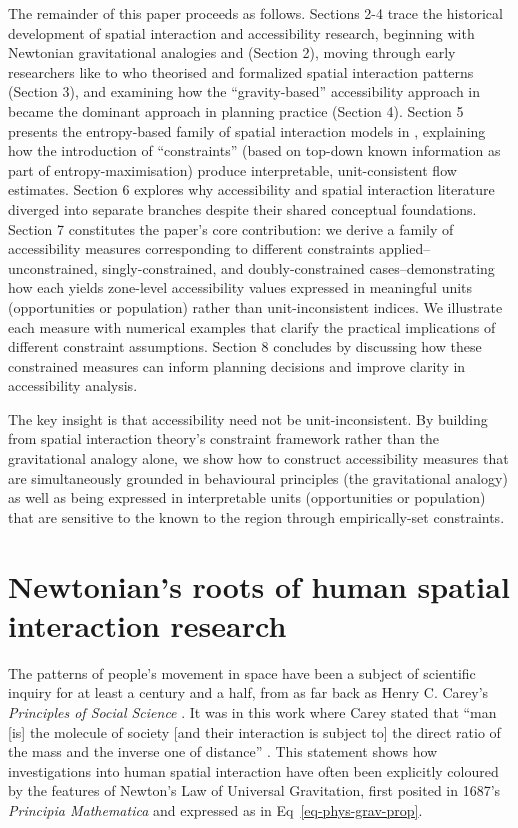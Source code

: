\documentclass[
  10pt,
  letterpaper,
]{article}
\begin{document}
The remainder of this paper proceeds as follows. Sections 2-4 trace the
historical development of spatial interaction and accessibility
research, beginning with Newtonian gravitational analogies and
\citet{careyPrinciplesSocialScience1858} (Section 2), moving through
early researchers like \citet{ravensteinLawsMigration1885} to
\citet{stewartDemographicGravitationEvidence1948} who theorised and
formalized spatial interaction patterns (Section 3), and examining how
the ``gravity-based'' accessibility approach in \citet{hansen1959}
became the dominant approach in planning practice (Section 4). Section 5
presents the entropy-based family of spatial interaction models in
\citet{wilson1971}, explaining how the introduction of ``constraints''
(based on top-down known information as part of entropy-maximisation)
produce interpretable, unit-consistent flow estimates. Section 6
explores why accessibility and spatial interaction literature diverged
into separate branches despite their shared conceptual foundations.
Section 7 constitutes the paper's core contribution: we derive a family
of accessibility measures corresponding to different constraints
applied--unconstrained, singly-constrained, and doubly-constrained
cases--demonstrating how each yields zone-level accessibility values
expressed in meaningful units (opportunities or population) rather than
unit-inconsistent indices. We illustrate each measure with numerical
examples that clarify the practical implications of different constraint
assumptions. Section 8 concludes by discussing how these constrained
measures can inform planning decisions and improve clarity in
accessibility analysis.

The key insight is that accessibility need not be unit-inconsistent. By
building from spatial interaction theory's constraint framework rather
than the gravitational analogy alone, we show how to construct
accessibility measures that are simultaneously grounded in behavioural
principles (the gravitational analogy) as well as being expressed in
interpretable units (opportunities or population) that are sensitive to
the known to the region through empirically-set constraints.

\section{Newtonian's roots of human spatial interaction
research}\label{newtonians-roots-of-human-spatial-interaction-research}

The patterns of people's movement in space have been a subject of
scientific inquiry for at least a century and a half, from as far back
as Henry C. Carey's \emph{Principles of Social Science}
\citep{careyPrinciplesSocialScience1858}. It was in this work where
Carey stated that ``man {[}is{]} the molecule of society {[}and their
interaction is subject to{]} the direct ratio of the mass and the
inverse one of distance'' \citep[pp.~37-38]{mckeanManual1883}. This
statement shows how investigations into human spatial interaction have
often been explicitly coloured by the features of Newton's Law of
Universal Gravitation, first posited in 1687's \emph{Principia
Mathematica} and expressed as in Eq~\ref{eq-phys-grav-prop}.
\end{document}
